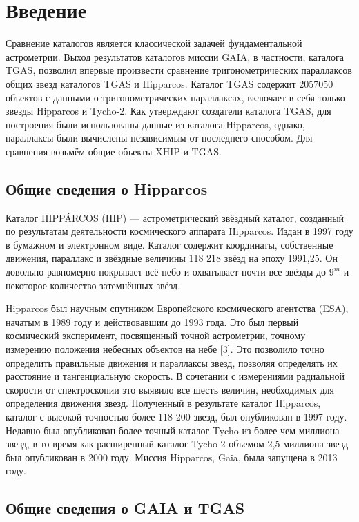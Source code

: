 \documentclass[14pt]{article} %
\begin{document}
 
\section{Введение}\label{introduction}


Сравнение каталогов является классической задачей фундаментальной астрометрии. Выход результатов каталогов миссии GAIA, в частности, каталога TGAS, позволил впервые произвести сравнение тригонометрических параллаксов общих звезд каталогов TGAS и  Hipparcos. Каталог TGAS содержит 2057050 объектов с данными о тригонометрических параллаксах, включает в себя только звезды Hipparcos и Tycho-2. Как утверждают создатели каталога TGAS, для построения были использованы данные из каталога Hipparcos, однако, параллаксы были вычислены независимым от последнего способом. Для сравнения возьмём общие объекты XHIP и TGAS.

\subsection{Общие сведения о Hipparcos}\label{sub:smthhip}
Каталог HIPPÁRCOS (HIP) — астрометрический звёздный каталог, созданный по результатам деятельности космического аппарата Hipparcos. Издан в 1997 году в бумажном и электронном виде. Каталог содержит координаты, собственные движения, параллакс и звёздные величины 118 218 звёзд на эпоху 1991,25. Он довольно равномерно покрывает всё небо и охватывает почти все звёзды до $9^m$ и некоторое количество затемнённых звёзд.

Hipparcos был научным спутником Европейского космического агентства (ESA), начатым в 1989 году и действовавшим до 1993 года. Это был первый космический эксперимент, посвященный точной астрометрии, точному измерению положения небесных объектов на небе [3]. Это позволило точно определить правильные движения и параллаксы звезд, позволяя определять их расстояние и тангенциальную скорость. В сочетании с измерениями радиальной скорости от спектроскопии это выявило все шесть величин, необходимых для определения движения звезд. Полученный в результате каталог Hipparcos, каталог с высокой точностью более 118 200 звезд, был опубликован в 1997 году. Недавно был опубликован более точный каталог Tycho из более чем миллиона звезд, в то время как расширенный каталог Tycho-2 объемом 2,5 миллиона звезд был опубликован в 2000 году. Миссия Hipparcos, Gaia, была запущена в 2013 году.

\subsection{Общие сведения о GAIA и TGAS}\label{sub:smthgaia}
\end{document}
